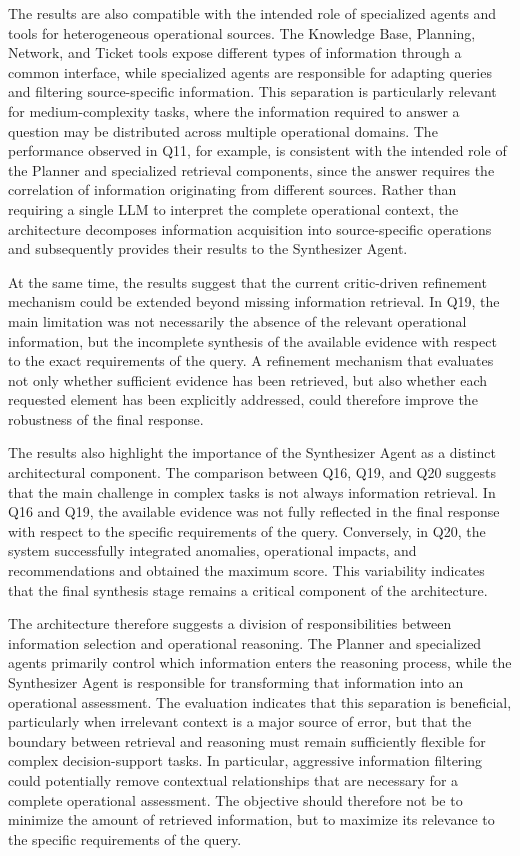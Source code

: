 The results are also compatible with the intended role of specialized agents and tools for heterogeneous operational sources. The Knowledge Base, Planning, Network, and Ticket tools expose different types of information through a common interface, while specialized agents are responsible for adapting queries and filtering source-specific information. This separation is particularly relevant for medium-complexity tasks, where the information required to answer a question may be distributed across multiple operational domains. The performance observed in Q11, for example, is consistent with the intended role of the Planner and specialized retrieval components, since the answer requires the correlation of information originating from different sources. Rather than requiring a single LLM to interpret the complete operational context, the architecture decomposes information acquisition into source-specific operations and subsequently provides their results to the Synthesizer Agent.


At the same time, the results suggest that the current critic-driven refinement mechanism could be extended beyond missing information retrieval. In Q19, the main limitation was not necessarily the absence of the relevant operational information, but the incomplete synthesis of the available evidence with respect to the exact requirements of the query. A refinement mechanism that evaluates not only whether sufficient evidence has been retrieved, but also whether each requested element has been explicitly addressed, could therefore improve the robustness of the final response. 

The results also highlight the importance of the Synthesizer Agent as a distinct architectural component. The comparison between Q16, Q19, and Q20 suggests that the main challenge in complex tasks is not always information retrieval. In Q16 and Q19, the available evidence was not fully reflected in the final response with respect to the specific requirements of the query. Conversely, in Q20, the system successfully integrated anomalies, operational impacts, and recommendations and obtained the maximum score. This variability indicates that the final synthesis stage remains a critical component of the architecture. 

The architecture therefore suggests a division of responsibilities between information selection and operational reasoning. The Planner and specialized agents primarily control which information enters the reasoning process, while the Synthesizer Agent is responsible for transforming that information into an operational assessment. The evaluation indicates that this separation is beneficial, particularly when irrelevant context is a major source of error, but that the boundary between retrieval and reasoning must remain sufficiently flexible for complex decision-support tasks. In particular, aggressive information filtering could potentially remove contextual relationships that are necessary for a complete operational assessment. The objective should therefore not be to minimize the amount of retrieved information, but to maximize its relevance to the specific requirements of the query.

